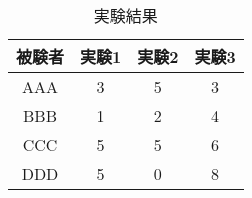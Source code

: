 \begin{table}[htb]
  \begin{center}
    \caption{実験結果}
    \begin{tabular}{|c||c|c|c|} \hline
      被験者 & 実験1 & 実験2 & 実験3 \\ \hline
      AAA & 3 & 5 & 3 \\ \hline
      BBB & 1 & 2 & 4\\ \hline
      CCC & 5 & 5 & 6 \\ \hline
      DDD & 5 & 0 & 8\\ \hline
    \end{tabular}
  \end{center}
\end{table}
